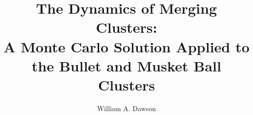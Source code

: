 \documentclass[12pt]{emulateapj}
\begin{document}

\title{The Dynamics of Merging Clusters:\\
		A Monte Carlo Solution Applied to the Bullet and Musket Ball Clusters}


\author{William A. Dawson}
    


\end{document}
